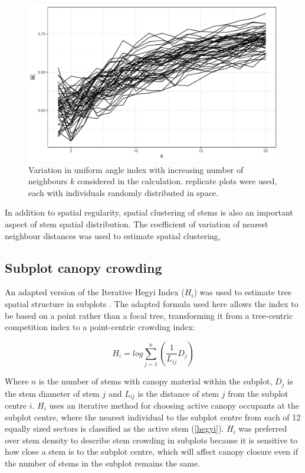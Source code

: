 \documentclass[11pt,a4paper]{article}
\begin{document}
\begin{figure}
\centering
	\includegraphics[width=\linewidth]{wi_k}
	\caption{Variation in uniform angle index with increasing number of neighbours $k$ considered in the calculation. \wikn{} replicate plots were used, each with \wiki{} individuals randomly distributed in space.}
	\label{wi_k}
\end{figure}

In addition to spatial regularity, spatial clustering of stems is also an important aspect of stem spatial distribution. The coefficient of variation of nearest neighbour distances was used to estimate spatial clustering, 

\subsection{Subplot canopy crowding}

An adapted version of the Iterative Hegyi Index ($H_{i}$) was used to estimate tree spatial structure in subplots \citep{Hegyi1974}. The adapted formula used here allows the index to be based on a point rather than a focal tree, transforming it from a tree-centric competition index to a point-centric crowding index:

\begin{equation}
	H_{i} = log\sum_{j=1}^{n} (\frac{1}{L_{ij}} D_{j})
\end{equation}

Where $n$ is the number of stems with canopy material within the subplot, $D_{j}$ is the stem diameter of stem $j$ and $L_{ij}$ is the distance of stem $j$ from the subplot centre $i$. $H_{i}$ uses an iterative method for choosing active canopy occupants at the subplot centre, where the nearest individual to the subplot centre from each of 12 equally sized sectors is classified as the active stem (\autoref{hegyi}). $H_{i}$ was preferred over stem density to describe stem crowding in subplots because it is sensitive to how close a stem is to the subplot centre, which will affect canopy closure even if the number of stems in the subplot remains the same. 
\end{document}
